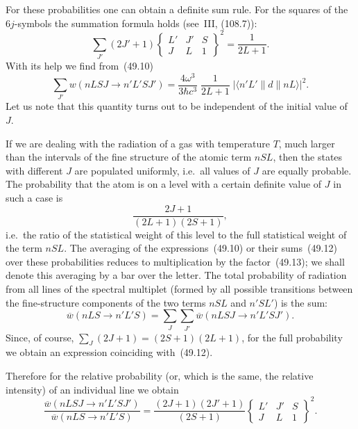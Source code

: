 For these probabilities one can obtain a definite sum rule. For the squares of the $6j$-symbols the summation formula holds (see~III, (108.7)):
\begin{equation}
\sum_{J'}(2J'+1)\begin{Bmatrix} L' & J' & S \\ J & L & 1\end{Bmatrix}^{\!2} = \frac{1}{2L+1}.
\tag{49.11}
\end{equation}
With its help we find from~(49.10)
\begin{equation}
\sum_{J'}w(nLSJ \to n'L'SJ') = \frac{4\omega^3}{3\hbar c^3}\;\frac{1}{2L+1}\;|\langle n'L'\|d\|nL\rangle|^2.
\tag{49.12}
\end{equation}
Let us note that this quantity turns out to be independent of the initial value of $J$.

If we are dealing with the radiation of a gas with temperature $T$, much larger than the intervals of the fine structure of the atomic term $nSL$, then the states with different $J$ are populated uniformly, i.e.\ all values of $J$ are equally probable. The probability that the atom is on a level with a certain definite value of $J$ in such a case is
\begin{equation}
\frac{2J+1}{(2L+1)(2S+1)},
\tag{49.13}
\end{equation}
i.e.\ the ratio of the statistical weight of this level to the full statistical weight of the term $nSL$. The averaging of the expressions~(49.10) or their sums~(49.12) over these probabilities reduces to multiplication by the factor~(49.13); we shall denote this averaging by a bar over the letter.
The total probability of radiation from all lines of the spectral multiplet (formed by all possible transitions between the fine-structure components of the two terms $nSL$ and $n'SL'$) is the sum:
\begin{equation}
\overline{w}(nLS \to n'L'S) = \sum_J\sum_{J'}\overline{w}(nLSJ \to n'L'SJ').
\tag{49.14}
\end{equation}
Since, of course, $\sum_J(2J+1) = (2S+1)(2L+1)$, for the full probability we obtain an expression coinciding with~(49.12).

Therefore for the relative probability (or, which is the same, the relative intensity) of an individual line we obtain
\begin{equation}
\frac{\overline{w}(nLSJ \to n'L'SJ')}{\overline{w}(nLS \to n'L'S)} = \frac{(2J+1)(2J'+1)}{(2S+1)}\begin{Bmatrix} L' & J' & S \\ J & L & 1\end{Bmatrix}^{\!2}.
\tag{49.15}
\end{equation}

